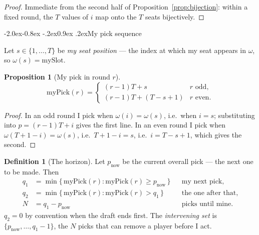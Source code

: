 \documentclass[10pt,a4paper]{article}
\makeatletter
\theoremstyle{plain}
\newtheorem{proposition}[theorem]{Proposition}
\theoremstyle{definition}
\newtheorem{definition}[theorem]{Definition}
\theoremstyle{remark}
\renewcommand\subsection{\@startsection{subsection}{2}{\z@}%
  {-2.0ex\@plus -0.8ex \@minus -.2ex}{0.9ex \@plus .2ex}{\normalfont\large\bfseries}}
\makeatother
\begin{document}
\begin{proof}
Immediate from the second half of Proposition~\ref{prop:bijection}: within a fixed
round, the $T$ values of $i$ map onto the $T$ seats bijectively.
\end{proof}

\subsection{My pick sequence}

Let $s \in \{1, \dots, T\}$ be \emph{my seat position} --- the index at which my seat
appears in $\omega$, so $\omega(s) = \text{mySlot}$.

\begin{proposition}[My pick in round $r$]
\label{prop:mypick}
\begin{equation}
\mathrm{myPick}(r) =
\begin{cases}
(r-1)T + s          & r \text{ odd},\\
(r-1)T + (T - s + 1) & r \text{ even}.
\end{cases}
\label{eq:mypick}
\end{equation}
\end{proposition}

\begin{proof}
In an odd round I pick when $\omega(i) = \omega(s)$, i.e.\ when $i = s$; substituting
into $p = (r-1)T + i$ gives the first line. In an even round I pick when
$\omega(T+1-i) = \omega(s)$, i.e.\ $T+1-i = s$, i.e.\ $i = T-s+1$, which gives the
second.
\end{proof}

\begin{definition}[The horizon]
Let $p_{\text{now}}$ be the current overall pick --- the next one to be made. Then
\begin{align}
q_1 &= \min\{\, \mathrm{myPick}(r) : \mathrm{myPick}(r) \ge p_{\text{now}} \,\} && \text{my next pick,} \label{eq:nextpick}\\
q_2 &= \min\{\, \mathrm{myPick}(r) : \mathrm{myPick}(r) > q_1 \,\} && \text{the one after that,} \label{eq:following}\\
N   &= q_1 - p_{\text{now}} && \text{picks until mine.} \label{eq:picksuntil}
\end{align}
$q_2 = 0$ by convention when the draft ends first. The \emph{intervening set} is
$\{p_{\text{now}}, \dots, q_1 - 1\}$, the $N$ picks that can remove a player before I
act.
\end{definition}
\end{document}
